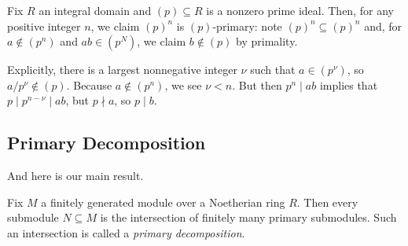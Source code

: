 \documentclass[../notes.tex]{subfiles}
\begin{document}
\begin{example} \label{ex:primepowerprimary}
	Fix $R$ an integral domain and $(p)\subseteq R$ is a nonzero prime ideal. Then, for any positive integer $n$, we claim $(p)^n$ is $(p)$-primary: note $(p)^n\subseteq(p)^n$ and, for $a\notin(p^n)$ and $ab\in(p^N)$, we claim $b\notin(p)$ by primality.
	
	Explicitly, there is a largest nonnegative integer $\nu$ such that $a\in\left(p^\nu\right)$, so $a/p^\nu\notin(p)$. Because $a\notin\left(p^n\right)$, we see $\nu<n$. But then $p^n\mid ab$ implies that $p\mid p^{n-\nu}\mid ab$, but $p\nmid a$, so $p\mid b$.
\end{example}

\subsection{Primary Decomposition}
And here is our main result.
\begin{theorem} \label{thm:primdecompi}
	Fix $M$ a finitely generated module over a Noetherian ring $R$. Then every submodule $N\subseteq M$ is the intersection of finitely many primary submodules. Such an intersection is called a \textit{primary decomposition}.
\end{theorem}
\end{document}
